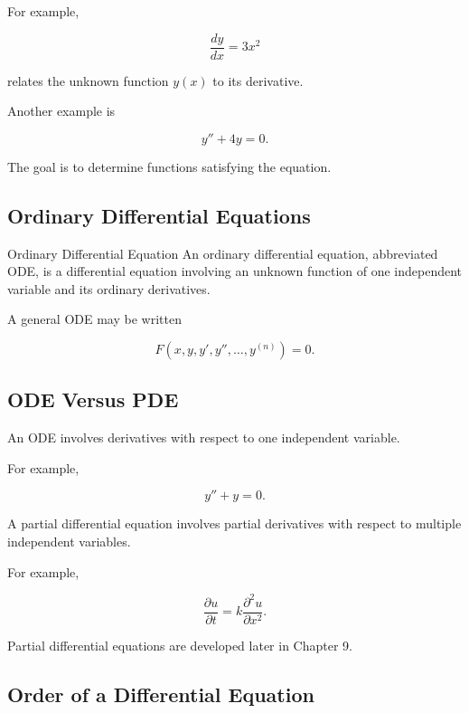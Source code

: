 For example,

\[
\boxed{
\frac{dy}{dx}
=
3x^2
}
\]

relates the unknown function \(y(x)\) to its derivative.

Another example is

\[
\boxed{
y''+4y=0.
}
\]

The goal is to determine functions satisfying the equation.

\subsection{Ordinary Differential Equations}
\label{subsec:definition-ode}

\begin{definitionbox}{Ordinary Differential Equation}
An ordinary differential equation, abbreviated ODE, is a differential
equation involving an unknown function of one independent variable and
its ordinary derivatives.
\end{definitionbox}

A general ODE may be written

\[
\boxed{
F
\left(
x,
y,
y',
y'',
\ldots,
y^{(n)}
\right)
=
0.
}
\]

\subsection{ODE Versus PDE}
\label{subsec:ode-versus-pde}

An ODE involves derivatives with respect to one independent variable.

For example,

\[
\boxed{
y''+y=0.
}
\]

A partial differential equation involves partial derivatives with respect
to multiple independent variables.

For example,

\[
\boxed{
\frac{\partial u}{\partial t}
=
k
\frac{\partial^2u}{\partial x^2}.
}
\]

Partial differential equations are developed later in Chapter 9.

\subsection{Order of a Differential Equation}
\label{subsec:ode-order}

